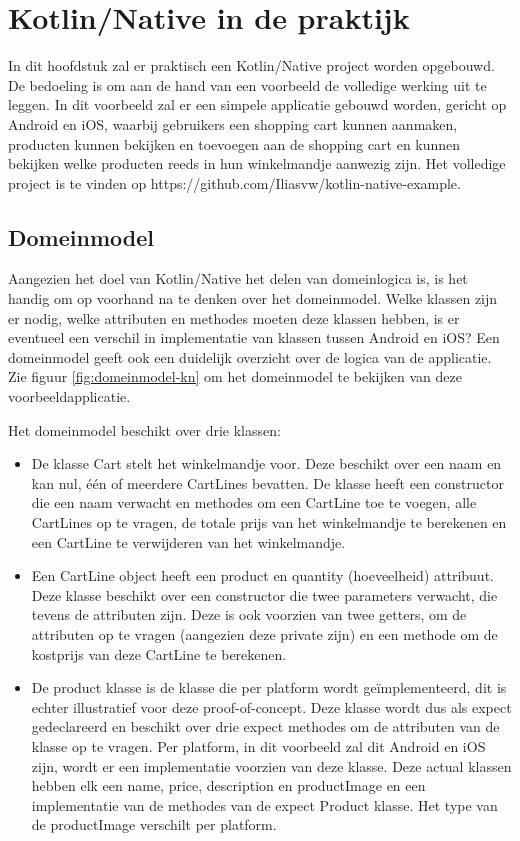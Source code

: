 \chapter{Kotlin/Native in de praktijk}
\label{ch:praktisch}
In dit hoofdstuk zal er praktisch een Kotlin/Native project worden opgebouwd. De bedoeling is om aan de hand van een voorbeeld de volledige werking uit te leggen. In dit voorbeeld zal er een simpele applicatie gebouwd worden, gericht op Android en iOS, waarbij gebruikers een shopping cart kunnen aanmaken, producten kunnen bekijken en toevoegen aan de shopping cart en kunnen bekijken welke producten reeds in hun winkelmandje aanwezig zijn. Het volledige project is te vinden op https://github.com/Iliasvw/kotlin-native-example.

\section{Domeinmodel}
\label{sec:domeinmodel}
Aangezien het doel van Kotlin/Native het delen van domeinlogica is, is het handig om op voorhand na te denken over het domeinmodel. Welke klassen zijn er nodig, welke attributen en methodes moeten deze klassen hebben, is er eventueel een verschil in implementatie van klassen tussen Android en iOS? Een domeinmodel geeft ook een duidelijk overzicht over de logica van de applicatie. Zie figuur \ref{fig:domeinmodel-kn} om het domeinmodel te bekijken van deze voorbeeldapplicatie. 

Het domeinmodel beschikt over drie klassen: 
\begin{itemize}
	\item De klasse Cart stelt het winkelmandje voor. Deze beschikt over een naam en kan nul, één of meerdere CartLines bevatten. De klasse heeft een constructor die een naam verwacht en methodes om een CartLine toe te voegen, alle CartLines op te vragen, de totale prijs van het winkelmandje te berekenen en een CartLine te verwijderen van het winkelmandje.
	
	\item Een CartLine object heeft een product en quantity (hoeveelheid) attribuut. Deze klasse beschikt over een constructor die twee parameters verwacht, die tevens de attributen zijn. Deze is ook voorzien van twee getters, om de attributen op te vragen (aangezien deze private zijn) en een methode om de kostprijs van deze CartLine te berekenen.
	
	\item De product klasse is de klasse die per platform wordt geïmplementeerd, dit is echter illustratief voor deze proof-of-concept. Deze klasse wordt dus als expect gedeclareerd en beschikt over drie expect methodes om de attributen van de klasse op te vragen. Per platform, in dit voorbeeld zal dit Android en iOS zijn, wordt er een implementatie voorzien van deze klasse. Deze actual klassen hebben elk een name, price, description en productImage en een implementatie van de methodes van de expect Product klasse. Het type van de productImage verschilt per platform.
\end{itemize}

